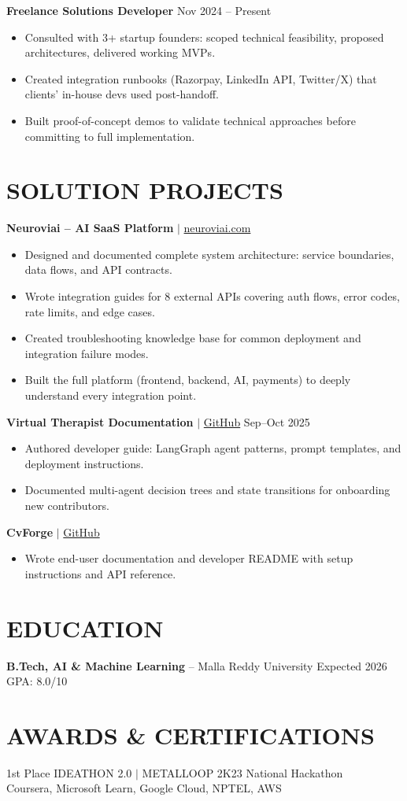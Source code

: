 \documentclass[10pt]{article}
\begin{document}
\textbf{Freelance Solutions Developer} \hfill Nov 2024 -- Present
\begin{itemize}
\item Consulted with 3+ startup founders: scoped technical feasibility, proposed architectures, delivered working MVPs.
\item Created integration runbooks (Razorpay, LinkedIn API, Twitter/X) that clients' in-house devs used post-handoff.
\item Built proof-of-concept demos to validate technical approaches before committing to full implementation.
\end{itemize}

\section*{SOLUTION PROJECTS}
\textbf{Neuroviai -- AI SaaS Platform} $|$ \href{https://neuroviai.com}{neuroviai.com}
\begin{itemize}
\item Designed and documented complete system architecture: service boundaries, data flows, and API contracts.
\item Wrote integration guides for 8 external APIs covering auth flows, error codes, rate limits, and edge cases.
\item Created troubleshooting knowledge base for common deployment and integration failure modes.
\item Built the full platform (frontend, backend, AI, payments) to deeply understand every integration point.
\end{itemize}

\textbf{Virtual Therapist Documentation} $|$ \href{https://github.com/JeetInTech/Virtual-Therapist---LangGraph-Agentic-AI-System}{GitHub} \hfill Sep--Oct 2025
\begin{itemize}
\item Authored developer guide: LangGraph agent patterns, prompt templates, and deployment instructions.
\item Documented multi-agent decision trees and state transitions for onboarding new contributors.
\end{itemize}

\textbf{CvForge} $|$ \href{https://github.com/JeetInTech/CvForge-Online}{GitHub}
\begin{itemize}
\item Wrote end-user documentation and developer README with setup instructions and API reference.
\end{itemize}

\section*{EDUCATION}
\textbf{B.Tech, AI \& Machine Learning} -- Malla Reddy University \hfill Expected 2026 \hfill GPA: 8.0/10

\section*{AWARDS \& CERTIFICATIONS}
1st Place IDEATHON 2.0 $|$ METALLOOP 2K23 National Hackathon \\
Coursera, Microsoft Learn, Google Cloud, NPTEL, AWS
\end{document}
